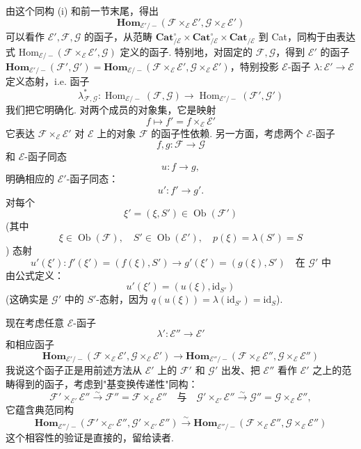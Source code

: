 由这个同构 (i) 和前一节末尾，得出
\[
\mathbf{Hom}_{\mathcal{E}'/-}(\mathcal{F} \times_{\mathcal{E}} \mathcal{E}', \mathcal{G} \times_{\mathcal{E}} \mathcal{E}')
\]
可以看作 $\mathcal{E}', \mathcal{F}, \mathcal{G}$ 的函子，从范畴 $\mathbf{Cat}_{/\mathcal{E}}^{\circ} \times \mathbf{Cat}_{/\mathcal{E}}^{\circ} \times \mathbf{Cat}_{/\mathcal{E}}$ 到 Cat，同构于由表达式 Hom$_{\mathcal{E}/-}(\mathcal{F} \times_{\mathcal{E}} \mathcal{E}', \mathcal{G})$ 定义的函子. 特别地，对固定的 $\mathcal{F}, \mathcal{G}$，得到 $\mathcal{E}'$ 的函子 $\mathbf{Hom}_{\mathcal{E}'/-}(\mathcal{F}', \mathcal{G}') = \mathbf{Hom}_{\mathcal{E}/-}(\mathcal{F} \times_{\mathcal{E}} \mathcal{E}', \mathcal{G} \times_{\mathcal{E}} \mathcal{E}')$，特别投影 $\mathcal{E}$-函子 $\lambda \colon \mathcal{E}' \to \mathcal{E}$ 定义态射，i.e. 函子
\[
\lambda_{\mathcal{F},\mathcal{G}}^{*} \colon \operatorname{Hom}_{\mathcal{E}/-}(\mathcal{F}, \mathcal{G}) \longrightarrow \operatorname{Hom}_{\mathcal{E}'/-}(\mathcal{F}', \mathcal{G}')
\]
我们把它明确化. 对两个成员的对象集，它是映射
\[
f \longmapsto f' = f \times_{\mathcal{E}} \mathcal{E}'
\]
它表达 $\mathcal{F} \times_{\mathcal{E}} \mathcal{E}'$ 对 $\mathcal{E}$ 上的对象 $\mathcal{F}$ 的函子性依赖. 另一方面，考虑两个 $\mathcal{E}$-函子
\[
f, g \colon \mathcal{F} \longrightarrow \mathcal{G}
\]
和 $\mathcal{E}$-函子同态
\[
u \colon f \longrightarrow g,
\]
明确相应的 $\mathcal{E}'$-函子同态：
\[
u' \colon f' \longrightarrow g'.
\]
对每个
\[
\xi' = (\xi, S') \in \operatorname{Ob}(\mathcal{F}')
\]
(其中
\[
\xi \in \operatorname{Ob}(\mathcal{F}), \quad S' \in \operatorname{Ob}(\mathcal{E}'), \quad p(\xi) = \lambda(S') = S
\])
态射
\[
u'(\xi') \colon f'(\xi') = (f(\xi), S') \longrightarrow g'(\xi') = (g(\xi), S') \quad \text{在 } \mathcal{G}' \text{ 中}
\]
由公式定义：
\[
u'(\xi') = (u(\xi), \mathrm{id}_{S'})
\]
(这确实是 $\mathcal{G}'$ 中的 $S'$-态射，因为 $q(u(\xi)) = \lambda(\mathrm{id}_{S'}) = \mathrm{id}_S$).

现在考虑任意 $\mathcal{E}$-函子
\[
\lambda' \colon \mathcal{E}'' \longrightarrow \mathcal{E}'
\]
和相应函子
\[
\mathbf{Hom}_{\mathcal{E}'/-}(\mathcal{F} \times_{\mathcal{E}} \mathcal{E}', \mathcal{G} \times_{\mathcal{E}} \mathcal{E}') \longrightarrow \mathbf{Hom}_{\mathcal{E}''/-}(\mathcal{F} \times_{\mathcal{E}} \mathcal{E}'', \mathcal{G} \times_{\mathcal{E}} \mathcal{E}'')
\]
我说这个函子正是用前述方法从 $\mathcal{E}'$ 上的 $\mathcal{F}'$ 和 $\mathcal{G}'$ 出发、把 $\mathcal{E}''$ 看作 $\mathcal{E}'$ 之上的范畴得到的函子，考虑到"基变换传递性"同构：
\[
\mathcal{F}' \times_{\mathcal{E}'} \mathcal{E}'' \stackrel{\sim}{\longrightarrow} \mathcal{F}'' = \mathcal{F} \times_{\mathcal{E}} \mathcal{E}'' \quad \text{与} \quad \mathcal{G}' \times_{\mathcal{E}'} \mathcal{E}'' \stackrel{\sim}{\longrightarrow} \mathcal{G}'' = \mathcal{G} \times_{\mathcal{E}} \mathcal{E}'',
\]
它蕴含典范同构
\[
\mathbf{Hom}_{\mathcal{E}''/-}(\mathcal{F}' \times_{\mathcal{E}'} \mathcal{E}'', \mathcal{G}' \times_{\mathcal{E}'} \mathcal{E}'') \stackrel{\sim}{\longrightarrow} \mathbf{Hom}_{\mathcal{E}''/-}(\mathcal{F} \times_{\mathcal{E}} \mathcal{E}'', \mathcal{G} \times_{\mathcal{E}} \mathcal{E}'')
\]
这个相容性的验证是直接的，留给读者.

